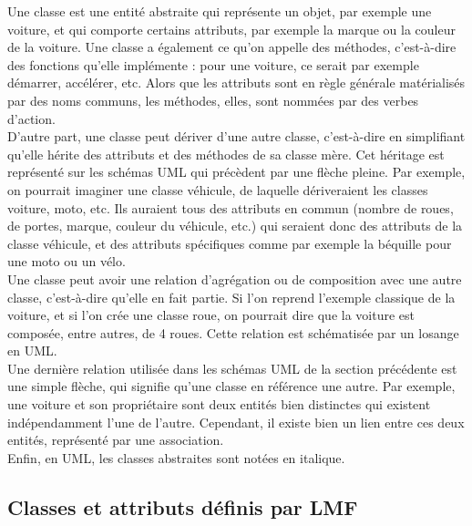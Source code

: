 \documentclass[a4paper,12pt]{article}
\begin{document}
Une classe est une entit\'e abstraite qui repr\'esente un objet, par exemple une voiture, et qui comporte certains attributs, par exemple la marque ou la couleur de la voiture. Une classe a \'egalement ce qu'on appelle des m\'ethodes, c'est-\`a-dire des fonctions qu'elle impl\'emente : pour une voiture, ce serait par exemple d\'emarrer, acc\'el\'erer, etc. Alors que les attributs sont en r\`egle g\'en\'erale mat\'erialis\'es par des noms communs, les m\'ethodes, elles, sont nomm\'ees par des verbes d'action.\\
D'autre part, une classe peut d\'eriver d'une autre classe, c'est-\`a-dire en simplifiant qu'elle h\'erite des attributs et des m\'ethodes de sa classe m\`ere. Cet h\'eritage est repr\'esent\'e sur les sch\'emas UML qui pr\'ec\`edent par une fl\`eche pleine. Par exemple, on pourrait imaginer une classe v\'ehicule, de laquelle d\'eriveraient les classes voiture, moto, etc. Ils auraient tous des attributs en commun (nombre de roues, de portes, marque, couleur du v\'ehicule, etc.) qui seraient donc des attributs de la classe v\'ehicule, et des attributs sp\'ecifiques comme par exemple la b\'equille pour une moto ou un v\'elo.\\
Une classe peut avoir une relation d'agr\'egation ou de composition avec une autre classe, c'est-\`a-dire qu'elle en fait partie. Si l'on reprend l'exemple classique de la voiture, et si l'on cr\'ee une classe roue, on pourrait dire que la voiture est compos\'ee, entre autres, de 4 roues. Cette relation est sch\'ematis\'ee par un losange en UML.\\
Une dernière relation utilis\'ee dans les sch\'emas UML de la section pr\'ec\'edente est une simple fl\`eche, qui signifie qu'une classe en r\'ef\'erence une autre. Par exemple, une voiture et son propri\'etaire sont deux entit\'es bien distinctes qui existent ind\'ependamment l'une de l'autre. Cependant, il existe bien un lien entre ces deux entit\'es, repr\'esent\'e par une association.\\
Enfin, en UML, les classes abstraites sont not\'ees en italique.

\subsection{Classes et attributs d\'efinis par LMF}
\end{document}

